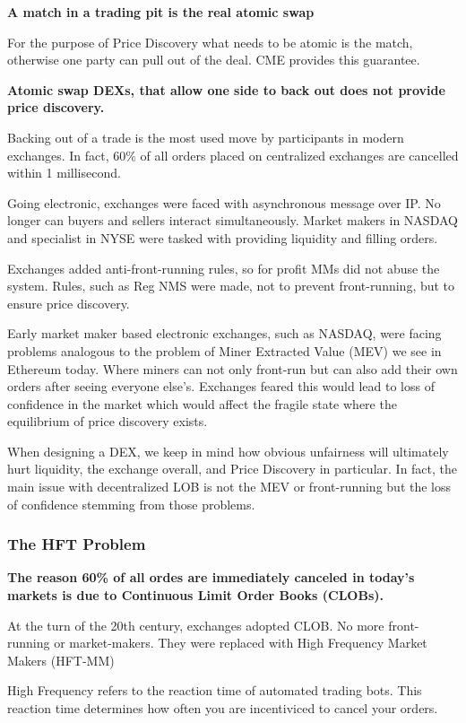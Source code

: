 \documentclass[12pt]{article}
\begin{document}
\textbf{A match in a trading pit is the real atomic swap} 

For the purpose of Price Discovery what needs to be atomic is the  match, otherwise one party can pull out of the deal. CME provides this guarantee. 

\textbf{Atomic swap DEXs, that allow one side to back out does not provide price discovery.}

Backing out of a trade is the most used move by participants in modern exchanges. In fact, 60\%  of all orders placed on centralized exchanges are cancelled within 1 millisecond. \cite{notsure}  

Going electronic, exchanges were faced with asynchronous message over IP. No longer can buyers and sellers interact simultaneously. Market makers in NASDAQ and specialist in NYSE were tasked with providing liquidity and filling orders. 

Exchanges added anti-front-running rules, so for profit MMs did not abuse the system. Rules, such as Reg NMS were made, not to prevent front-running, 
but to ensure price discovery. \cite{notsure} 

Early market maker based electronic exchanges, such as NASDAQ, were facing problems analogous to the problem of Miner Extracted Value (MEV) we see in Ethereum today. Where miners can not only front-run but can also add their own orders after seeing everyone else's. Exchanges feared this would lead to loss of confidence in the market which would affect the fragile state where the equilibrium of price discovery exists. 

When designing a DEX, we keep in mind how obvious unfairness will ultimately hurt liquidity, the exchange overall, and Price Discovery in particular. In fact, the main issue with decentralized LOB is not the MEV or front-running but the loss of confidence stemming from those problems.  


\subsubsection*{The HFT Problem}
\textbf{The reason 60\% of all ordes are immediately canceled in today's markets is due to Continuous Limit Order Books (CLOBs).}

At the turn of the 20th century, exchanges adopted CLOB. No more front-running or market-makers. They were replaced with High Frequency Market Makers (HFT-MM) 

High Frequency refers to the reaction time of automated trading bots. This reaction time determines how often you are incentiviced to cancel your orders. 
\end{document}
